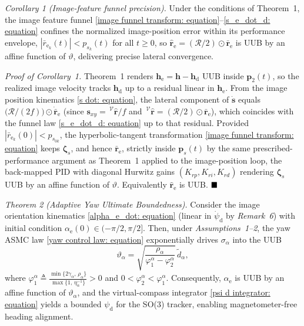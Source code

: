 \documentclass{IEEEtaes}
\begin{document}
\textit{Corollary 1 (Image-feature funnel precision).} Under the conditions of Theorem~1, the image feature funnel \eqref{image funnel transform: equation}--\eqref{s_e_dot_d: equation} confines the normalized image-position error within its performance envelope, $|\bar{r}_{\text{e}_k}(t)|<p_{s_k}(t)$ for all $t\ge 0$, so $\hat{\boldsymbol{r}}_\text{e}=(\mathcal{R}/2)\odot\bar{\boldsymbol{r}}_\text{e}$ is UUB by an affine function of $\vartheta$, delivering precise lateral convergence.

\textit{Proof of Corollary~1.} Theorem~1 renders $\boldsymbol{h}_\text{e}=\boldsymbol{h}-\boldsymbol{h}_\text{d}$ UUB inside $\boldsymbol{p}_2(t)$, so the realized image velocity tracks $\boldsymbol{h}_\text{d}$ up to a residual linear in $\boldsymbol{h}_\text{e}$. From the image position kinematics \eqref{s dot: equation}, the lateral component of $\dot{\boldsymbol{s}}$ equals $\big(\mathcal{R}/(2f)\big)\odot\dot{\bar{\boldsymbol{r}}}_\text{e}$ (since $\boldsymbol{s}_{xy}=\,^\mathcal{V}\hat{\boldsymbol{r}}/f$ and $\,^\mathcal{V}\hat{\boldsymbol{r}}=(\mathcal{R}/2)\odot\bar{\boldsymbol{r}}_\text{e}$), which coincides with the funnel law \eqref{s_e_dot_d: equation} up to that residual. Provided $|\bar{r}_{\text{e}_k}(0)|<p_{s_{0k}}$, the hyperbolic-tangent transformation \eqref{image funnel transform: equation} keeps $\boldsymbol{\zeta}_s$, and hence $\bar{\boldsymbol{r}}_\text{e}$, strictly inside $\boldsymbol{p}_s(t)$ by the same prescribed-performance argument as Theorem~1 applied to the image-position loop, the back-mapped PID with diagonal Hurwitz gains $(K_{rp},K_{ri},K_{rd})$ rendering $\boldsymbol{\zeta}_s$ UUB by an affine function of $\vartheta$. Equivalently $\hat{\boldsymbol{r}}_\text{e}$ is UUB. $\hfill\blacksquare$

\textit{Theorem 2 (Adaptive Yaw Ultimate Boundedness).}
Consider the image orientation kinematics \eqref{alpha_e_dot: equation} (linear in $\dot{\psi}_\text{d}$ by \textit{Remark~6}) with initial condition $\alpha_\text{e}(0)\in(-\pi/2,\pi/2]$. Then, under \textit{Assumptions~1--2}, the yaw ASMC law \eqref{yaw control law: equation} exponentially drives $\sigma_\alpha$ into the UUB
\begin{equation} \label{yaw UUB bound: equation}
    \vartheta_\alpha = \sqrt{\frac{\rho_\alpha}{\varphi_1^\alpha-\varphi_2^\alpha}}\,\tilde{d}_\alpha,
\end{equation}
where $\varphi_1^\alpha \triangleq \frac{\min\{2\gamma_\alpha,\,\rho_\alpha\}}{\max\{1,\,\eta_\alpha^{-1}\}}>0$ and $0<\varphi_2^\alpha<\varphi_1^\alpha$. Consequently, $\alpha_\text{e}$ is UUB by an affine function of $\vartheta_\alpha$, and the virtual-compass integrator \eqref{psi d integrator: equation} yields a bounded $\psi_\text{d}$ for the SO(3) tracker, enabling magnetometer-free heading alignment.
\end{document}
